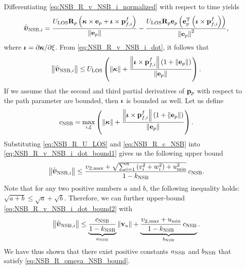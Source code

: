 Differentiating \eqref{eq:NSB_R_v_NSB_i_normalized} with respect to time yields
\begin{equation}
    \dot{\overline{\bm{\upsilon}}}_{{\rm NSB}, i} = 
    \frac{U_{\rm LOS}\mathbf{R}_p\left(\bm{\kappa}\times\mathbf{e}_p + \bm{\iota}\times\mathbf{p}_{f,i}^f\right)}{\left\|\mathbf{e}_p\right\|}
    - \frac{U_{\rm LOS}\mathbf{R}_p\mathbf{e}_p\left(\mathbf{e}_p^{\mathrm{T}}\left(\bm{\iota}\times\mathbf{p}_{f,i}^f\right)\right)}{\left\|\mathbf{e}_p\right\|^2},
    \label{eq:NSB_R_v_NSB_i_dot}
\end{equation}
where $\bm{\iota} = \partial \bm{\kappa} / \partial \xi$. From \eqref{eq:NSB_R_v_NSB_i_dot}, it follows that
\begin{equation}
    \left\|\dot{\overline{\bm{\upsilon}}}_{{\rm NSB}, i}\right\| \leq
    U_{\rm LOS} \left(\left\|\bm{\kappa}\right\| + \frac{\left\|\bm{\iota}\times\mathbf{p}_{f,i}^f\right\|\left(1 + \left\|\mathbf{e}_p\right\|\right)}{\left\|\mathbf{e}_p\right\|}\right).
    \label{eq:NSB_R_v_NSB_i_dot_bound1}
\end{equation}
If we assume that the second and third partial derivatives of $\mathbf{p}_p$ with respect to the path parameter are bounded, then $\bm{\iota}$ is bounded as well.
Let us define
\begin{equation}
    c_{\rm NSB} = \max_{i, \xi} \left(\left\|\bm{\kappa}\right\| + \frac{\left\|\bm{\iota}\times\mathbf{p}_{f,i}^f\right\|\left(1 + \left\|\mathbf{e}_p\right\|\right)}{\left\|\mathbf{e}_p\right\|}\right).
    \label{eq:NSB_R_c_NSB}
\end{equation}
Substituting \eqref{eq:NSB_R_U_LOS} and \eqref{eq:NSB_R_c_NSB} into \eqref{eq:NSB_R_v_NSB_i_dot_bound1} gives us the following upper bound
\begin{equation}
    \left\|\dot{\overline{\bm{\upsilon}}}_{{\rm NSB}, i}\right\| \leq 
    \frac{\upsilon_{2, \max} + \sqrt{\sum_{i=1}^n \left(v_i^2 + w_i^2\right) + u_{\min}^2}}{1 - k_{\rm NSB}}\,c_{\rm NSB}.
    \label{eq:NSB_R_v_NSB_i_dot_bound2}
\end{equation}
Note that for any two positive numbers $a$ and $b$, the following inequality holds: $\sqrt{a + b} \leq \sqrt{a} + \sqrt{b}$.
Therefore, we can further upper-bound \eqref{eq:NSB_R_v_NSB_i_dot_bound2} with
\begin{equation}
    \left\|\dot{\overline{\bm{\upsilon}}}_{{\rm NSB}, i}\right\| \leq 
    \underbrace{\frac{c_{\rm NSB}}{1 - k_{\rm NSB}}}_{a_{\rm NSB}}\left\|\mathbf{v}_u\right\| +
    \underbrace{\frac{\upsilon_{2, \max} + u_{\min}}{1 - k_{\rm NSB}}\,c_{\rm NSB}}_{b_{\rm NSB}}.
\end{equation}
We have thus shown that there exist positive constants $a_{\rm NSB}$ and $b_{\rm NSB}$ that satisfy \eqref{eq:NSB_R_omega_NSB_bound}.

